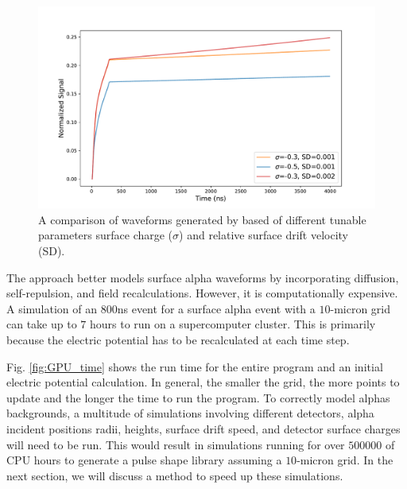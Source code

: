 \begin{figure}
    \includegraphics[trim={0.1cm 0.3cm 1.3cm 0.3cm},clip,width=0.99\linewidth]{ch3/figs/wf_comp.pdf}
    \caption{A comparison of waveforms generated by {\tdsim} based of different tunable parameters surface charge ($\sigma$) and relative surface drift velocity (SD).}
    \label{fig:wf_comp}
\end{figure}

The {\tdsim} approach better models surface alpha waveforms by incorporating diffusion, self-repulsion, and field recalculations. However, it is computationally expensive. A simulation of an $800$ns event for a surface alpha event with a $10$-micron grid can take up to $7$ hours to run on a supercomputer cluster. This is primarily because the electric potential has to be recalculated at each time step.


Fig. \ref{fig:GPU_time} shows the run time for the entire program and an initial electric potential calculation. In general, the smaller the grid, the more points to update and the longer the time to run the program. To correctly model alphas backgrounds, a multitude of simulations involving different detectors, alpha incident positions radii, heights, surface drift speed, and detector surface charges will need to be run. This would result in simulations running for over $500000$ of CPU hours to generate a pulse shape library assuming a $10$-micron grid. In the next section, we will discuss a method to speed up these simulations.


